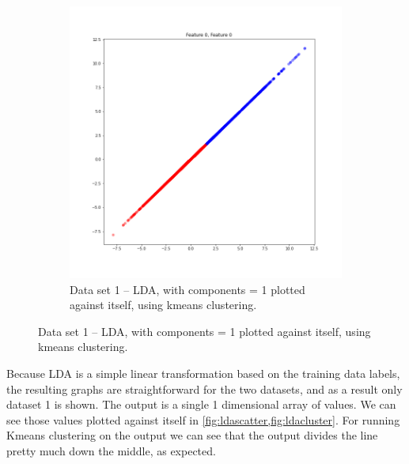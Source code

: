\documentclass[
letterpaper, %
]{IEEEtran}
\begin{document}
	\begin{figure}[ht]\ContinuedFloat
		\begin{subfigure}{.5\textwidth}
			\centering
			\includegraphics[width=\linewidth]{./images/ds1/lda/cluster.png}
			\caption{Data set 1 -- LDA, with components = 1 plotted against itself, using kmeans clustering.}
			\label{fig:ldacluster}
		\end{subfigure}
	\end{figure}
	
	Because LDA is a simple linear transformation based on the training data labels, the resulting graphs are straightforward for the two datasets, and as a result only dataset 1 is shown. The output is a single 1 dimensional array of values. We can see those values plotted against itself in \cref{fig:ldascatter,fig:ldacluster}. For running Kmeans clustering on the output we can see that the output divides the line pretty much down the middle, as expected.
	
\end{document}
